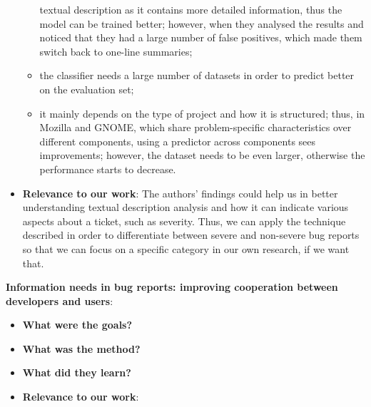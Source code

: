 \documentclass{mprop}
\begin{document}
\begin{itemize}
\begin{itemize}
        textual description as it contains more detailed information, thus the model can be
        trained better; however, when they analysed the results and noticed that they had a large
        number of false positives, which made them switch back to one-line summaries;
        \item the classifier needs a large number of datasets in order to predict better on the
        evaluation set;
        \item it mainly depends on the type of project and how it is structured; thus, in Mozilla
        and GNOME, which share problem-specific characteristics over different components, using a 
        predictor across components sees improvements; however, the dataset needs to be even larger,
        otherwise the performance starts to decrease.
      \end{itemize}
  \item \textbf{Relevance to our work}:
    The authors' findings could help us in better understanding textual description analysis and how
    it can indicate various aspects about a ticket, such as severity. Thus, we can apply the technique
    described in order to differentiate between severe and non-severe bug reports so that we can 
    focus on a specific category in our own research, if we want that.
\end{itemize}

\textbf{Information needs in bug reports: improving cooperation between developers and users}\cite{breu2010information}:
\begin{itemize}
  \item \textbf{What were the goals?}

  \item \textbf{What was the method?}
  \item \textbf{What did they learn?}
  \item \textbf{Relevance to our work}:
\end{itemize}
\end{document}
